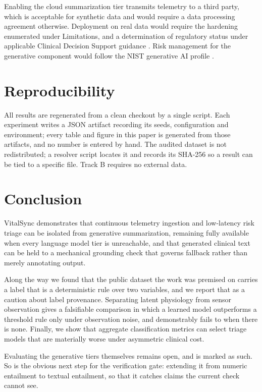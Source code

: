 \documentclass[lettersize,journal]{IEEEtran}
\begin{document}
Enabling the cloud summarization tier transmits telemetry to a third party,
which is acceptable for synthetic data and would require a data processing
agreement otherwise. Deployment on real data would require the hardening
enumerated under Limitations, and a determination of regulatory status under
applicable Clinical Decision Support guidance \cite{fda2026}. Risk management
for the generative component would follow the NIST generative AI profile
\cite{nist2024}.

\section{Reproducibility}

All results are regenerated from a clean checkout by a single script. Each
experiment writes a JSON artifact recording its seeds, configuration and
environment; every table and figure in this paper is generated from those
artifacts, and no number is entered by hand. The audited dataset is not
redistributed; a resolver script locates it and records its SHA-256 so a result
can be tied to a specific file. Track B requires no external data.

\section{Conclusion}

VitalSync demonstrates that continuous telemetry ingestion and low-latency risk
triage can be isolated from generative summarization, remaining fully available
when every language model tier is unreachable, and that generated clinical text
can be held to a mechanical grounding check that governs fallback rather than
merely annotating output.

Along the way we found that the public dataset the work was premised on carries
a label that is a deterministic rule over two variables, and we report that as a
caution about label provenance. Separating latent physiology from sensor
observation gives a falsifiable comparison in which a learned model outperforms
a threshold rule only under observation noise, and demonstrably fails to when
there is none. Finally, we show that aggregate classification metrics can select
triage models that are materially worse under asymmetric clinical cost.

Evaluating the generative tiers themselves remains open, and is marked as such.
So is the obvious next step for the verification gate: extending it from numeric
entailment to textual entailment, so that it catches claims the current check
cannot see.
\end{document}
